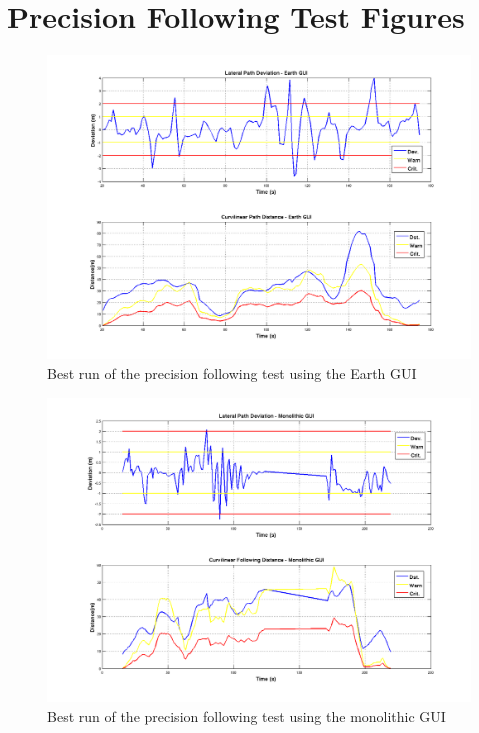 
\chapter{Precision Following Test Figures} \label{app:precisionresults}



\begin{figure}[ht] \centering %
    \includegraphics[width=5in]{./figs/precision_following_results_dst_dev_earth.png}
    \caption{Best run of the precision following test using the Earth GUI} \label{fig:precisionresults_earth}
\end{figure}

\begin{figure}[ht] \centering %
    \includegraphics[width=5in]{./figs/precision_following_results_dst_dev_monolith.png}
    \caption{Best run of the precision following test using the monolithic GUI} \label{fig:precisionresults_monolith}
\end{figure}


